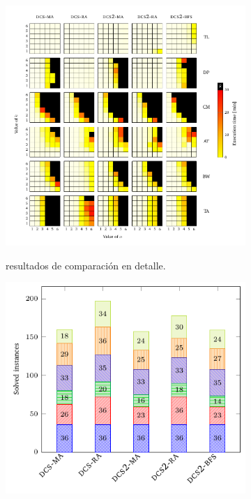 \begin{figure}[th]
    \centering
    \hspace*{-20mm}
    \begin{subfigure}{0.7\textwidth}
        \includegraphics[width=\linewidth]{figures/benchmark/dcs_vs.pdf}\label{fig:dcs:results:detailed}
        \caption{resultados de comparación \DCS en detalle.}
    \end{subfigure}%
    \begin{subfigure}{0.5\textwidth}
        \includegraphics[width=0.9\linewidth]{figures/benchmark/dcs_instances.pdf}\label{fig:dcs:results:instances}

\end{subfigure}
\end{figure}
